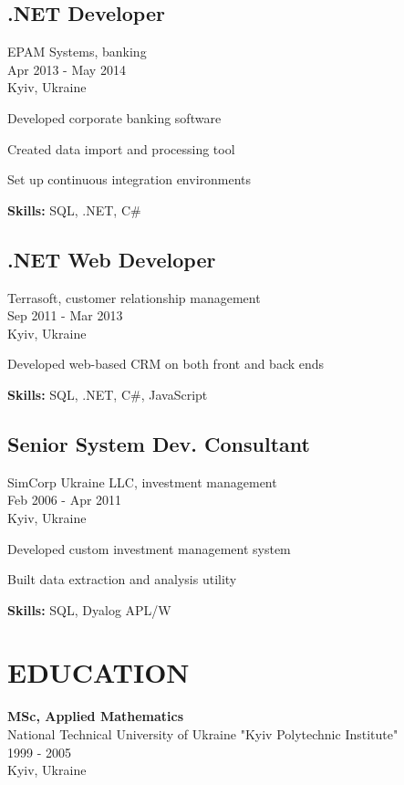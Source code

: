 \documentclass[a4paper,10pt]{article}
\begin{document}
\subsection*{.NET Developer}
EPAM Systems, banking \\
Apr 2013 - May 2014 \\
Kyiv, Ukraine
\begin{bulletlist}
    \item Developed corporate banking software
    \item Created data import and processing tool
    \item Set up continuous integration environments
\end{bulletlist}
\textbf{Skills:} SQL, .NET, C\#

\subsection*{.NET Web Developer}
Terrasoft, customer relationship management \\
Sep 2011 - Mar 2013 \\
Kyiv, Ukraine
\begin{bulletlist}
    \item Developed web-based CRM on both front and back ends
\end{bulletlist}
\textbf{Skills:} SQL, .NET, C\#, JavaScript

\subsection*{Senior System Dev. Consultant}
SimCorp Ukraine LLC, investment management \\
Feb 2006 - Apr 2011 \\
Kyiv, Ukraine
\begin{bulletlist}
    \item Developed custom investment management system
    \item Built data extraction and analysis utility
\end{bulletlist}
\textbf{Skills:} SQL, Dyalog APL/W

\section*{EDUCATION}
\textbf{MSc, Applied Mathematics} \\
National Technical University of Ukraine "Kyiv Polytechnic Institute" \\
1999 - 2005 \\
Kyiv, Ukraine
\end{document}

